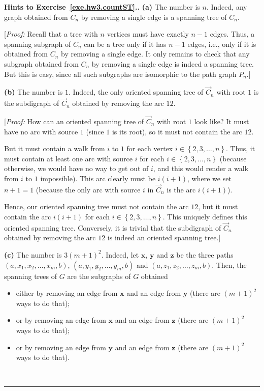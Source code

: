 \documentclass[numbers=enddot,12pt,final,onecolumn,notitlepage]{scrartcl}%
\theoremstyle{definition}
\newenvironment{proof}[1][Proof]{\noindent\textbf{#1.} }{\ \rule{0.5em}{0.5em}}
\newcommand{\set}[1]{\left\{ #1 \right\}}
\newcommand{\tup}[1]{\left( #1 \right)}
\begin{document}
\begin{proof}[Hints to Exercise~\ref{exe.hw3.countST}.]
\textbf{(a)} The number is $n$.
Indeed, any graph obtained from $C_n$ by removing a single edge is a
spanning tree of $C_n$.

[\textit{Proof:} Recall that a tree
with $n$ vertices must have exactly $n-1$ edges.
Thus, a spanning subgraph of $C_n$ can be a tree only if it has
$n-1$ edges,
i.e., only if it is obtained from $C_n$ by removing a single edge.
It only remains to check that any subgraph obtained from $C_n$ by
removing a single edge is indeed a spanning tree.
But this is easy, since all such subgraphs are isomorphic to the path
graph $P_n$.]

\textbf{(b)} The number is $1$.
Indeed, the only oriented spanning tree of $\overrightarrow{C}_n$ with
root $1$ is the subdigraph of $\overrightarrow{C}_n$ obtained by
removing the arc $12$.

[\textit{Proof:} How can an oriented spanning tree of
$\overrightarrow{C}_n$ with root $1$ look like?
It must have no arc with source $1$ (since $1$ is its root), so it
must not contain the arc $12$.

But it must contain a walk from $i$ to $1$ for each vertex
$i \in \set{2, 3, \ldots, n}$.
Thus, it must contain at least one arc with source $i$ for each
$i \in \set{2, 3, \ldots, n}$ (because otherwise, we would have no way
to get out of $i$, and this would render a walk from $i$ to $1$
impossible).
This arc clearly must be $i \tup{i+1}$, where we set $n+1 = 1$
(because the only arc with source $i$ in $\overrightarrow{C}_n$ is the
arc $i \tup{i+1}$).

Hence, our oriented spanning tree must not contain the arc $12$, but
it must contain the arc $i \tup{i+1}$ for each
$i \in \set{2, 3, \ldots, n}$.
This uniquely defines this oriented spanning tree.
Conversely, it is trivial that the subdigraph of
$\overrightarrow{C}_n$ obtained by removing the arc $12$ is indeed an
oriented spanning tree.]

\textbf{(c)} The number is $3 \tup{m+1}^2$.
Indeed, let $\mathbf{x}$, $\mathbf{y}$ and $\mathbf{z}$ be the three
paths $\tup{a, x_1, x_2, \ldots, x_m, b}$,
$\tup{a, y_1, y_2, \ldots, y_m, b}$ and
$\tup{a, z_1, z_2, \ldots, z_m, b}$.
Then, the spanning trees of $G$ are the subgraphs of $G$ obtained
\begin{itemize}
\item either by removing an edge from $\mathbf{x}$ and an edge from
      $\mathbf{y}$ (there are $\tup{m+1}^2$ ways to do that);
\item or by removing an edge from $\mathbf{x}$ and an edge from
      $\mathbf{z}$ (there are $\tup{m+1}^2$ ways to do that);
\item or by removing an edge from $\mathbf{y}$ and an edge from
      $\mathbf{z}$ (there are $\tup{m+1}^2$ ways to do that).
\end{itemize}


\end{proof}
\end{document}

